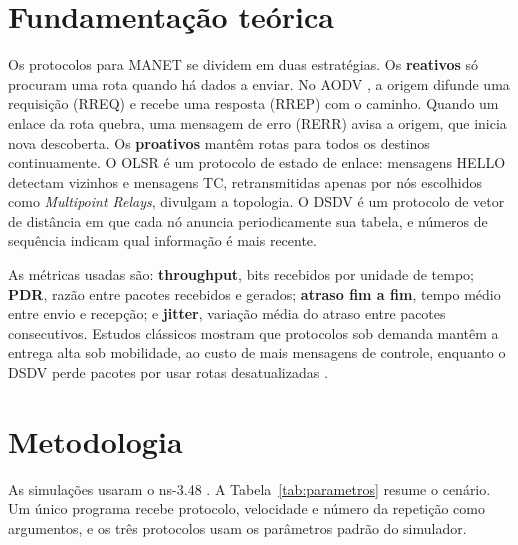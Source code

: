 \documentclass[12pt]{article}
\begin{document}
\section{Fundamentação teórica}

Os protocolos para MANET se dividem em duas estratégias. Os \textbf{reativos} só procuram
uma rota quando há dados a enviar. No AODV \cite{rfc3561}, a origem difunde uma requisição
(RREQ) e recebe uma resposta (RREP) com o caminho. Quando um enlace da rota quebra, uma
mensagem de erro (RERR) avisa a origem, que inicia nova descoberta.
Os \textbf{proativos} mantêm rotas para todos os destinos continuamente. O OLSR
\cite{rfc3626} é um protocolo de estado de enlace: mensagens HELLO detectam vizinhos e
mensagens TC, retransmitidas apenas por nós escolhidos como \emph{Multipoint Relays},
divulgam a topologia. O DSDV \cite{perkins1994dsdv} é um protocolo de vetor de distância em
que cada nó anuncia periodicamente sua tabela, e números de sequência indicam qual
informação é mais recente.

As métricas usadas são: \textbf{throughput}, bits recebidos por unidade de tempo;
\textbf{PDR}, razão entre pacotes recebidos e gerados; \textbf{atraso fim a fim}, tempo
médio entre envio e recepção; e \textbf{jitter}, variação média do atraso entre pacotes
consecutivos. Estudos clássicos mostram que protocolos sob demanda mantêm a entrega alta
sob mobilidade, ao custo de mais mensagens de controle, enquanto o DSDV perde pacotes por
usar rotas desatualizadas \cite{broch1998,johansson1999}.

\section{Metodologia}

As simulações usaram o ns-3.48 \cite{ns3docs}. A Tabela~\ref{tab:parametros} resume o
cenário. Um único programa recebe protocolo, velocidade e número da repetição como
argumentos, e os três protocolos usam os parâmetros padrão do simulador.
\end{document}
